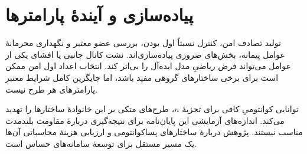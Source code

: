 \section{پیاده‌سازی و آیندۀ پارامترها}
تولید تصادف امن، کنترل نسبتاً اول بودن، بررسی عضو معتبر و نگهداری محرمانۀ عوامل پیمانه، بخش‌های ضروری پیاده‌سازی‌اند. نشت کانال جانبی یا افشای یکی از عوامل می‌تواند فرض ریاضیِ مدل ایده‌آل را بی‌اثر کند. انتخاب اعداد اول امن ممکن است برای برخی ساختارهای گروهی مفید باشد، اما جایگزین کامل شرایط معتبر پارامترهای هر طرح نیست.

توانایی کوانتومیِ کافی برای تجزیۀ $n$، طرح‌های متکی بر این خانوادۀ ساختارها را تهدید می‌کند. اندازه‌های آزمایشی این پایان‌نامه برای نتیجه‌گیری دربارۀ مقاومت بلندمدت مناسب نیستند. پژوهش دربارۀ ساختارهای پساکوانتومی و ارزیابی هزینۀ محاسباتی آن‌ها یک مسیر مستقل برای توسعۀ سامانه‌های حساس است.
